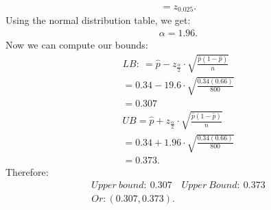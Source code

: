 \documentclass{report}
\begin{document}
\begin{mdframed}
\begin{align*}
            = z_{0.025}
        .\end{align*}
        Using the normal distribution table, we get:
        \begin{align*}
            \alpha = 1.96
        .\end{align*}
        \bigbreak \noindent 
        Now we can compute our bounds:
        \begin{align*}
            LB:\ = \hat{p} - z_{\frac{\alpha}{2}} \cdot \sqrt{\frac{\hat{p}(1-\hat{p})}{n}} \\
            = 0.34 - 19.6 \cdot \sqrt{\frac{0.34(0.66)}{800}} \\
            = 0.307 \\
            UB = \hat{p} + z_{\frac{\alpha}{2}} \cdot \sqrt{\frac{\hat{p}(1-\hat{p})}{n}} \\
            =0.34 + 1.96 \cdot \sqrt{\frac{0.34(0.66)}{800}} \\
            = 0.373
        .\end{align*}
        \bigbreak \noindent 
        Therefore:
        \begin{align*}
            Upper\ bound:\ 0.307 \quad Upper\ Bound:\ 0.373 \\
            Or: (0.307,0.373)
        .\end{align*}

    \end{mdframed}
\end{document}
